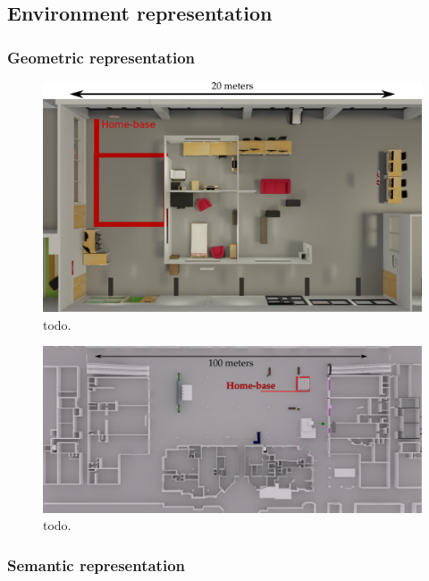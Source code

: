 \subsection{Environment representation}

\subsubsection{Geometric representation}

\begin{figure}[ht!]
\centering
\includegraphics[scale=0.15]{figures/chapter8/adream_base_m.png}
\caption{\label{fig:chap8_adream_base} todo. }
\end{figure}

\begin{figure}[ht!]
\centering
\includegraphics[scale=0.15]{figures/chapter8/ideapark_base_m.png}
\caption{\label{fig:chap8_ideapark_base} todo. }
\end{figure}

\subsubsection{Semantic representation}

